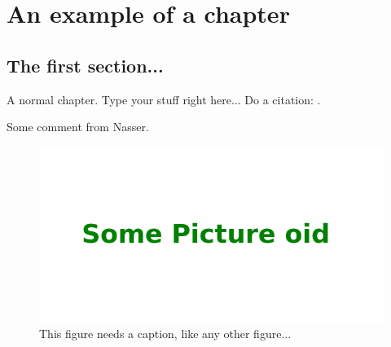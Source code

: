 \chapter{An example of a chapter}
\label{chap:intro}


\FloatBarrier
\section{The first section...}
\label{sec:general}

\par
A normal chapter. Type your stuff right here... Do a citation: \cite{Sn132}.

\par
\textcolor{Nasser}{Some comment from Nasser}.

\begin{figure}[htbp]
	\centering
		\includegraphics[width=1.00\textwidth]{./Figures/A_Figure.png}
	\caption{This figure needs a caption, like any other figure...}
	\label{fig:1p1h}
\end{figure}
